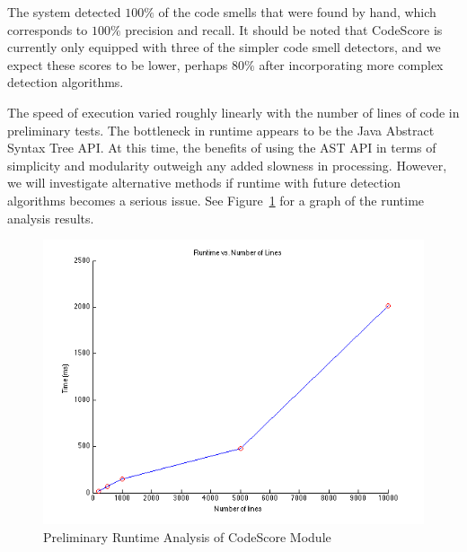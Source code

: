 \documentclass{sig-alternate}
\begin{document}
The system detected $100\%$ of the code smells that were found by hand, which
corresponds to $100\%$ precision and recall. It should be noted that CodeScore
is currently only equipped with three of the simpler code smell detectors, and we
expect these scores to be lower, perhaps $80\%$ after incorporating more complex
detection algorithms.

The speed of execution varied roughly linearly with the number of lines of code in
preliminary tests. The bottleneck in runtime appears to be the Java Abstract
Syntax Tree API. At this time, the benefits of using the AST API in terms of simplicity and
modularity outweigh any added slowness in processing. However, we will
investigate alternative methods if runtime with future detection algorithms
becomes a serious issue. See Figure~\ref{fig:runtime} for a graph of the runtime analysis results.

\begin{figure}
	\begin{center}
		\includegraphics[width=0.9\linewidth]{CodeScoreRuntimeGraph}
	\end{center}
	\vspace{-12pt}
	\caption{Preliminary Runtime Analysis of CodeScore Module}
	\label{fig:runtime}
\end{figure}
\end{document}
